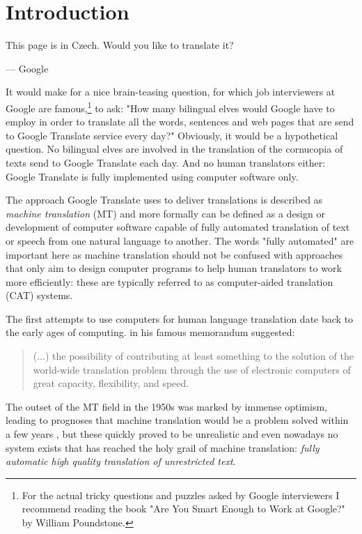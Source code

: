 \chapter{Introduction}
\label{chap:introduction}

\setlength{\epigraphwidth}{1.0\textwidth}
\epigraph{This page is in Czech. Would you like to translate it?}{--- Google}

It would make for a nice brain-teasing question, for which job interviewers
at Google are famous,\footnote{For the actual tricky questions and puzzles
asked by Google interviewers I recommend reading the book "Are You Smart
Enough to Work at Google?" by William Poundstone.} to ask:
"How many bilingual elves would Google have to employ in order to translate
all the words, sentences and web pages that are send to Google Translate
service every day?"
Obviously, it would be a hypothetical question. No bilingual elves are involved
in the translation of the cornucopia of texts send to Google Translate each day.
And no human translators either: Google Translate is fully implemented using
computer software only.

The approach Google Translate uses to deliver translations is described as
\emph{machine translation} (MT) and more formally can be defined as a design
or development of computer software capable of fully automated translation
of text or speech from one natural language to another.
The words "fully automated" are important here as machine translation should
not be confused with approaches that only aim to design computer programs
to help human translators to work more efficiently: these are typically
referred to as computer-aided translation (CAT) systems.

The first attempts to use computers for human language translation date
back to the early ages of computing. \citet{weaver:memorandum} in his famous
memorandum suggested:
\begin{quote}
(...) the possibility of contributing at least
something to the solution of the world-wide translation problem through the use
of electronic computers of great capacity, flexibility, and speed.
\end{quote}
The outset of the MT field in the 1950s was marked by immense optimism,
leading to prognoses that machine translation would be a problem solved within
a few years \citep{hutchins:mt}, but these quickly proved to be unrealistic and
even nowadays no system exists that has reached the holy grail of machine translation:
\emph{fully automatic high quality translation of unrestricted text}.

